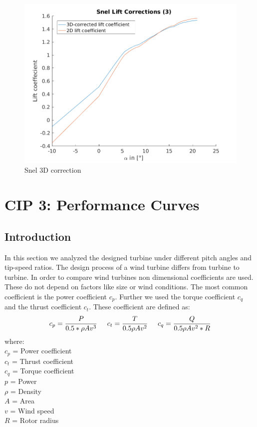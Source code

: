 \documentclass[10pt]{article}
\begin{document}
\begin{figure}[H]
\centering
\includegraphics[width=0.8\linewidth]{../CIP_2/Figures/snel_correction_3.png}
\caption{Snel 3D correction}
\label{fig:snel}
\end{figure}



\newpage
\section{CIP 3: Performance Curves}
\subsection{Introduction}
In this section we analyzed the designed turbine under different pitch angles and tip-speed ratios. The design process of a wind turbine differs from turbine to turbine. In order to compare wind turbines non dimensional coefficients are used. These do not depend on factors like size or wind conditions. The most common coefficient is the power coefficient $c_p$. Further we used the torque coefficient $c_q$ and the thrust coefficient $c_t$.
These coefficient are defined as:
\begin{align*}
c_p = \frac{P}{0.5 *\rho A v^3}\hspace{0.5cm}c_t =  \frac{T}{0.5\rho A v^2}\hspace{0.5cm}c_q = \frac{Q}{0.5\rho A v^2*R}\\
\end{align*}
where:\\
$c_p$ = Power coefficient\\
$c_t$ = Thrust coefficient\\
$c_q$ = Torque coefficient\\
$p$   = Power\\
$\rho$ = Density\\
$A$    = Area\\
$v$	   = Wind speed\\
$R$		= Rotor radius
\end{document}
